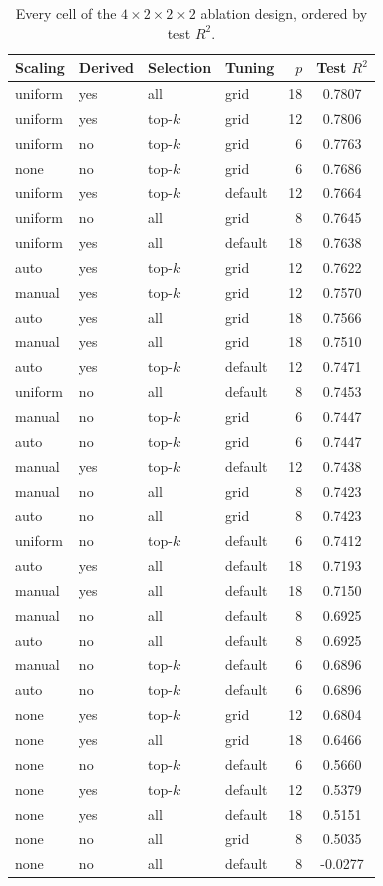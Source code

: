 \begin{table}[htbp]
\centering
\caption{Every cell of the $4 \times 2 \times 2 \times 2$ ablation design, ordered by test $R^2$.}\label{tab:ablation-cells}
\small
\begin{tabular}{llllrc}
\toprule
Scaling & Derived & Selection & Tuning & $p$ & Test $R^2$ \\
\midrule
uniform & yes & all & grid & 18 & 0.7807 \\
uniform & yes & top-$k$ & grid & 12 & 0.7806 \\
uniform & no & top-$k$ & grid & 6 & 0.7763 \\
none & no & top-$k$ & grid & 6 & 0.7686 \\
uniform & yes & top-$k$ & default & 12 & 0.7664 \\
uniform & no & all & grid & 8 & 0.7645 \\
uniform & yes & all & default & 18 & 0.7638 \\
auto & yes & top-$k$ & grid & 12 & 0.7622 \\
manual & yes & top-$k$ & grid & 12 & 0.7570 \\
auto & yes & all & grid & 18 & 0.7566 \\
manual & yes & all & grid & 18 & 0.7510 \\
auto & yes & top-$k$ & default & 12 & 0.7471 \\
uniform & no & all & default & 8 & 0.7453 \\
manual & no & top-$k$ & grid & 6 & 0.7447 \\
auto & no & top-$k$ & grid & 6 & 0.7447 \\
manual & yes & top-$k$ & default & 12 & 0.7438 \\
manual & no & all & grid & 8 & 0.7423 \\
auto & no & all & grid & 8 & 0.7423 \\
uniform & no & top-$k$ & default & 6 & 0.7412 \\
auto & yes & all & default & 18 & 0.7193 \\
manual & yes & all & default & 18 & 0.7150 \\
manual & no & all & default & 8 & 0.6925 \\
auto & no & all & default & 8 & 0.6925 \\
manual & no & top-$k$ & default & 6 & 0.6896 \\
auto & no & top-$k$ & default & 6 & 0.6896 \\
none & yes & top-$k$ & grid & 12 & 0.6804 \\
none & yes & all & grid & 18 & 0.6466 \\
none & no & top-$k$ & default & 6 & 0.5660 \\
none & yes & top-$k$ & default & 12 & 0.5379 \\
none & yes & all & default & 18 & 0.5151 \\
none & no & all & grid & 8 & 0.5035 \\
none & no & all & default & 8 & -0.0277 \\
\bottomrule
\end{tabular}
\end{table}